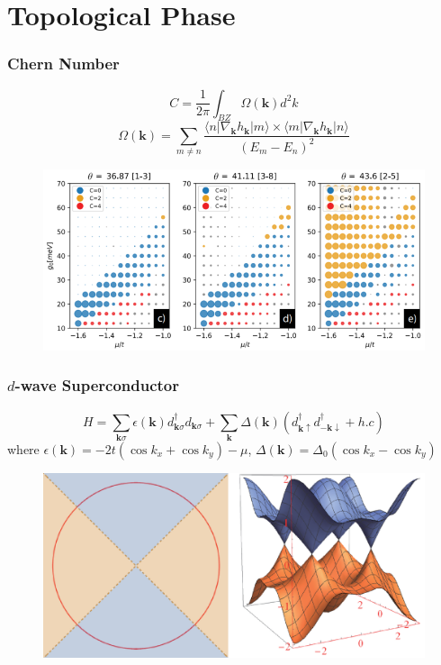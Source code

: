 \documentclass{beamer}
\begin{document}
\section{Topological Phase}
\begin{frame}
\frametitle{Chern Number}
\begin{equation}
C=\frac{1}{2\pi}\int_{BZ}\Omega(\mathbf{k})d^2k
\end{equation}
\begin{equation}
\Omega(\mathbf{k})=\sum_{m\neq n}\frac{\langle n|\nabla_\mathbf{k}h_\mathbf{k}|m\rangle\times\langle m|\nabla_\mathbf{k}h_\mathbf{k}|n\rangle}{(E_m-E_n)^2}
\end{equation}
\begin{figure}
\centering
\includegraphics[scale=0.5]{pic/p11.png}
\end{figure}
\end{frame}
\begin{frame}
\frametitle{$d$-wave Superconductor}
\begin{equation}
H=\sum_{\mathbf{k}\sigma}\epsilon(\mathbf{k})d^\dagger_{\mathbf{k}\sigma}d_{\mathbf{k}\sigma}+\sum_{\mathbf{k}}\Delta(\mathbf{k})(d^\dagger_{\mathbf{k}\uparrow}d^\dagger_{\mathbf{-k}\downarrow}+h.c)
\end{equation}
where $\epsilon(\mathbf{k})=-2t(\cos k_x+\cos k_y)-\mu$, $\Delta(\mathbf{k})=\Delta_0(\cos k_x-\cos k_y)$
\begin{figure}
\centering
\includegraphics[scale=0.25]{pic/p15.eps}
\end{figure}
\end{frame}
\end{document}
